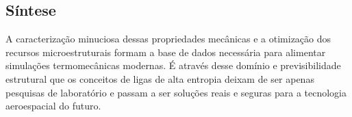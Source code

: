 \subsection{Síntese}\label{subsec:sintese}

A caracterização minuciosa dessas propriedades mecânicas e a otimização dos recursos microestruturais formam a base de dados necessária para alimentar simulações termomecânicas modernas. É através desse domínio e previsibilidade estrutural que os conceitos de ligas de alta entropia deixam de ser apenas pesquisas de laboratório e passam a ser soluções reais e seguras para a tecnologia aeroespacial do futuro.
